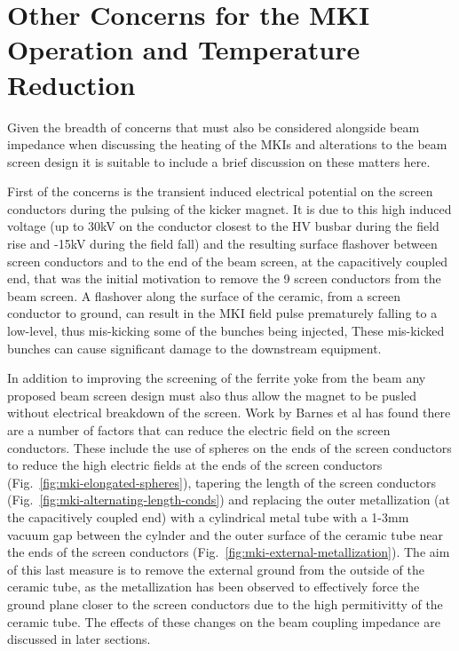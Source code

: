 \section{Other Concerns for the MKI Operation and Temperature Reduction}

Given the breadth of concerns that must also be considered alongside beam impedance when discussing the heating of the MKIs and alterations to the beam screen design it is suitable to include a brief discussion on these matters here. 

First of the concerns is the transient induced electrical potential on the screen conductors during the pulsing of the kicker magnet. It is due to this high induced voltage (up to 30kV on the conductor closest to the HV busbar during the field rise and -15kV during the field fall) and the resulting surface flashover between screen conductors and to the end of the beam screen, at the capacitively coupled end, that was the initial motivation to remove the 9 screen conductors from the beam screen. A flashover along the surface of the ceramic, from a screen conductor to ground, can result in the MKI field pulse prematurely falling to a low-level, thus mis-kicking some of the bunches being injected, These mis-kicked bunches can cause significant damage to the downstream equipment.

In addition to improving the screening of the ferrite yoke from the beam any proposed beam screen design must also thus allow the magnet to be pusled without electrical breakdown of the screen. Work by Barnes et al \cite{Barnes:eFieldMKI} has found there are a number of factors that can reduce the electric field on the screen conductors. These include the use of spheres on the ends of the screen conductors to reduce the high electric fields at the ends of the screen conductors (Fig.~\ref{fig:mki-elongated-spheres}), tapering the length of the screen conductors (Fig.~\ref{fig:mki-alternating-length-conds}) and replacing the outer metallization (at the capacitively coupled end) with a cylindrical metal tube with a 1-3mm vacuum gap between the cylnder and the outer surface of the ceramic tube near the ends of the screen conductors (Fig.~\ref{fig:mki-external-metallization}). The aim of this last measure is to remove the external ground from the outside of the ceramic tube, as the metallization has been observed to effectively force the ground plane closer to the screen conductors due to the high permitivitty of the ceramic tube. The effects of these changes on the beam coupling impedance are discussed in later sections.

